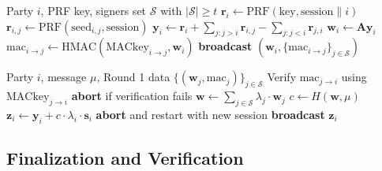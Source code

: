 \begin{algorithm}[H]
\caption{Pulsar Signing --- Round 1 (Message-Independent)}
\label{alg:sign-r1}
\begin{algorithmic}[1]
\Require Party $i$, PRF key, signers set $\mathcal{S}$ with $|\mathcal{S}| \geq t$
\State {}
\State $\mathbf{r}_i \gets \text{PRF}(\text{key}, \text{session} \| i)$ 
    \State $\mathbf{r}_{i,j} \gets \text{PRF}(\text{seed}_{i,j}, \text{session})$ 
\EndFor
\State $\mathbf{y}_i \gets \mathbf{r}_i + \sum_{j : j > i} \mathbf{r}_{i,j} - \sum_{j : j < i} \mathbf{r}_{j,i}$
\State $\mathbf{w}_i \gets \mathbf{A} \mathbf{y}_i$ 
\State {}
    \State $\text{mac}_{i \to j} \gets \text{HMAC}(\text{MACkey}_{i \to j}, \mathbf{w}_i)$
\EndFor
\State \textbf{broadcast} $(\mathbf{w}_i, \{\text{mac}_{i \to j}\}_{j \in \mathcal{S}})$
\end{algorithmic}
\end{algorithm}

\begin{algorithm}[H]
\caption{Pulsar Signing --- Round 2 (Message-Dependent)}
\label{alg:sign-r2}
\begin{algorithmic}[1]
\Require Party $i$, message $\mu$, Round 1 data $\{(\mathbf{w}_j, \text{mac}_j)\}_{j \in \mathcal{S}}$
\State {}
    \State Verify $\text{mac}_{j \to i}$ using $\text{MACkey}_{j \to i}$
    \State \textbf{abort} if verification fails
\EndFor
\State $\mathbf{w} \gets \sum_{j \in \mathcal{S}} \lambda_j \cdot \mathbf{w}_j$ 
\State $c \gets H(\mathbf{w}, \mu)$ 
\State $\mathbf{z}_i \gets \mathbf{y}_i + c \cdot \lambda_i \cdot \mathbf{s}_i$ 
\State {}
    \State \textbf{abort} and restart with new session
\EndIf
\State \textbf{broadcast} $\mathbf{z}_i$
\end{algorithmic}
\end{algorithm}

\subsection{Finalization and Verification}


